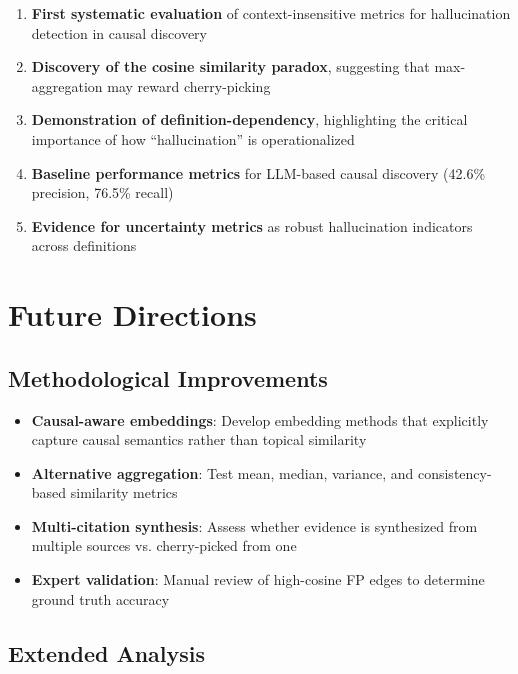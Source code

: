 \begin{enumerate}
    \item \textbf{First systematic evaluation} of context-insensitive metrics for hallucination detection in causal discovery
    
    \item \textbf{Discovery of the cosine similarity paradox}, suggesting that max-aggregation may reward cherry-picking
    
    \item \textbf{Demonstration of definition-dependency}, highlighting the critical importance of how ``hallucination'' is operationalized
    
    \item \textbf{Baseline performance metrics} for LLM-based causal discovery (42.6\% precision, 76.5\% recall)
    
    \item \textbf{Evidence for uncertainty metrics} as robust hallucination indicators across definitions
\end{enumerate}

\section{Future Directions}

\subsection{Methodological Improvements}

\begin{itemize}
    \item \textbf{Causal-aware embeddings}: Develop embedding methods that explicitly capture causal semantics rather than topical similarity
    
    \item \textbf{Alternative aggregation}: Test mean, median, variance, and consistency-based similarity metrics
    
    \item \textbf{Multi-citation synthesis}: Assess whether evidence is synthesized from multiple sources vs. cherry-picked from one
    
    \item \textbf{Expert validation}: Manual review of high-cosine FP edges to determine ground truth accuracy
\end{itemize}

\subsection{Extended Analysis}

